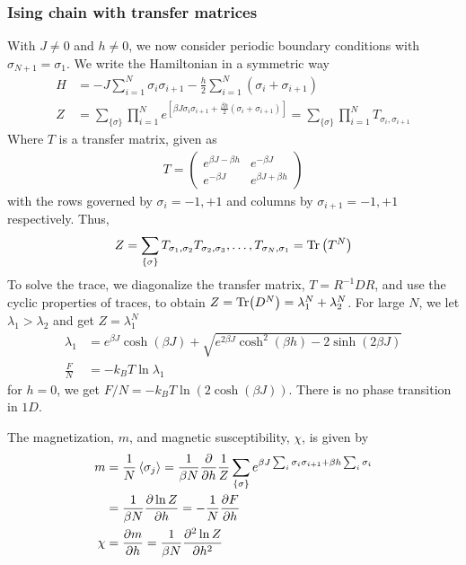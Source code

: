 \documentclass[a4paper, english, 12pt]{article}
\newcommand{\closed}[1]{\left( #1 \right)}
\newcommand{\bracket}[1]{\left[ #1 \right]}
\newcommand{\curly}[1]{\{ #1 \} }
\begin{document}
\begin{multicols*}{2}
\subsubsection*{\scriptsize Ising chain with transfer matrices}
With $J\neq0$ and $h\neq0$, we now consider periodic boundary conditions with $\sigma_{N+1}=\sigma_1$. We write the Hamiltonian in a symmetric way 
\begin{align*}
    H &= -J\sum_{i=1}^N \sigma_i \sigma_{i+1} - \frac{h}{2}\sum_{i=1}^N (\sigma_i+\sigma_{i+1}) \\
    Z &= \sum_{\curly{\sigma}} \prod_{i=1}^N e^{\bracket{\beta J \sigma_i \sigma_{i+1} + \frac{\beta h}{2}(\sigma_i + \sigma_{i+1}) }} = \sum_{\curly{\sigma}} \prod_{i=1}^N T_{\sigma_i,\sigma_{i+1}}
\end{align*}
Where $T$ is a transfer matrix, given as 
\begin{align*}
    T = \begin{pmatrix}
        e^{\beta J-\beta h} & e^{-\beta J} \\ 
        e^{-\beta J} & e^{\beta J + \beta h}
    \end{pmatrix}
\end{align*}
with the rows governed by $\sigma_i=-1,+1$ and columns by $\sigma_{i+1}=-1,+1$ respectively. Thus, 
\begin{align*}
    Z = \sum_{\curly{\sigma}} T_{\sigma_1,\sigma_2} T_{\sigma_2,\sigma_3},\dots,T_{\sigma_N,\sigma_1} = \Tr\closed{T^N}
\end{align*}
To solve the trace, we diagonalize the transfer matrix, $T=R^{-1}DR$, and use the cyclic properties of traces, to obtain $Z=\Tr(D^N)=\lambda_1^N + \lambda_2^N$. For large $N$, we let $\lambda_1>\lambda_2$ and get $Z = \lambda_1^N$
\begin{align*}
    \lambda_1 &= e^{\beta J}\cosh(\beta J) + \sqrt{e^{2\beta J}\cosh^2(\beta h)-2\sinh(2\beta J) } \\ 
    \frac{F}{N} &=-k_B T \ln\lambda_1
\end{align*}
for $h=0$, we get $F/N=-k_B T \ln(2\cosh(\beta J))$. There is no phase transition in $1D$. 

The magnetization, $m$, and magnetic susceptibility, $\chi$, is given by 
\begin{align*}
    m &= \frac{1}{N} \expval{\sigma_j} = \frac{1}{\beta N} \pdv{h} \frac{1}{Z}\sum_{\curly{\sigma}} e^{\beta J \sum_i \sigma_i \sigma_{i+1} + \beta h \sum_i \sigma_i} \\ 
    &= \frac{1}{\beta N} \pdv{\ln Z}{h} = -\frac{1}{N}\pdv{F}{h} \\ 
    \chi &= \pdv{m}{h} = \frac{1}{\beta N} \pdv[2]{\ln Z}{h}
\end{align*}




\end{multicols*}
\end{document}
